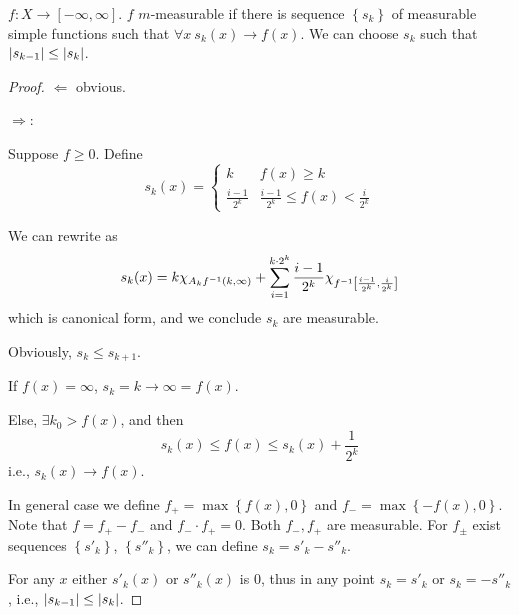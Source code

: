 \begin{theorem}
	$f: X\to [-\infty, \infty]$. $f$ $m$-measurable if there is sequence $\left\{s_k \right\}$ of measurable simple functions such that $\forall x \: s_k(x) \to f(x)$. We can choose $s_k$ such that $\abs{s_{k-1}} \leq \abs{s_k}$.
	
	\begin{proof}
		$\Leftarrow$ obvious.
		
		$\Rightarrow$:
		
		Suppose $f\geq 0$. Define
		$$s_k(x) = \begin{cases}
		k & f(x)\geq k\\
		\frac{i-1}{2^k} & \frac{i-1}{2^k} \leq f(x) < \frac{i}{2^k}
		\end{cases}$$
		
		We can rewrite as
		$$s_k(x) = k\chi_{A_kf^{-1}(k,\infty)} + \sum_{i=1}^{k\cdot 2^k} \frac{i-1}{2^k} \chi_{f^{-1}\qty[\frac{i-1}{2^k},\frac{i}{2^k}]}$$
		which is canonical form, and we conclude $s_k$ are measurable.
		
		Obviously, $s_k\leq s_{k+1}$.
		
		If $f(x) = \infty$, $s_k=k \to \infty=f(x) $.
		
		Else, $\exists k_0> f(x)$, and then
		$$s_k(x) \leq f(x) \leq s_k(x) + \frac{1}{2^k}$$
		i.e., $s_k(x) \to f(x)$.
		
		
		In general case we define $f_+ = \max \left\{f(x),0 \right\}$ and $f_- = \max \left\{-f(x),0 \right\}$. Note that $f=f_+-f_-$ and $f_-\cdot f_+ = 0$. Both $f_-, f_+$ are measurable. For $f_\pm$ exist sequences $\left\{ s'_k \right\}$, $\left\{ s''_k \right\}$, we can define $s_k=s'_k-s''_k$. 
		
		For any $x$ either $s'_k(x)$ or $s''_k(x)$ is $0$, thus in any point $s_k=s'_k$ or $s_k=-s''_k$, i.e., $\abs{s_{k-1}} \leq \abs{s_k}$. 
	\end{proof}
\end{theorem}

